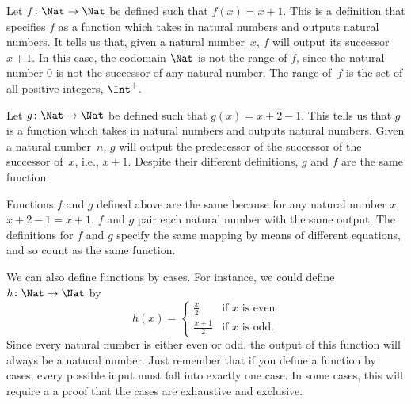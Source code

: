 \documentclass[../../../include/open-logic-section]{subfiles}
\begin{document}
\begin{ex}
Let $f \colon \Nat \to \Nat$ be defined such that $f(x) = x+1$. This
is a definition that specifies $f$ as a function which takes in
natural numbers and outputs natural numbers. It tells us that, given a
natural number~$x$, $f$ will output its successor~$x+1$.
In this case, the codomain $\Nat$ is not the range of $f$, since the
natural number $0$ is not the successor of any natural number. The
range of~$f$ is the set of all positive integers, $\Int^{+}$.
\end{ex}

\begin{ex}
Let $g \colon \Nat \to \Nat$ be defined such that $g(x) = x+2-1$. This
tells us that $g$ is a function which takes in natural numbers and
outputs natural numbers. Given a natural number~$n$, $g$ will output
the predecessor of the successor of the successor of~$x$, i.e.,
$x+1$. Despite their different definitions, $g$ and $f$ are the same
function.
\end{ex}

\begin{explain}
Functions $f$ and $g$ defined above are the same because for any
natural number $x$, $x+2-1 = x+1$. $f$ and $g$ pair each natural
number with the same output. The definitions for $f$ and $g$ specify
the same mapping by means of different equations, and so count as the
same function.
\end{explain}

\begin{ex}
We can also define functions by cases. For instance, we could define
$h \colon \Nat \to \Nat$  by
\[
h(x) =
\begin{cases}
  \frac{x}{2} & \text{if $x$ is even} \\
  \frac{x+1}{2} & \text{if $x$ is odd.}
\end{cases}
\]
Since every natural number is either even or odd, the output of this
function will always be a natural number. Just remember that if you
define a function by cases, every possible input must fall into
exactly one case.  In some cases, this will require a a proof that the
cases are exhaustive and exclusive.
\end{ex}
\end{document}
